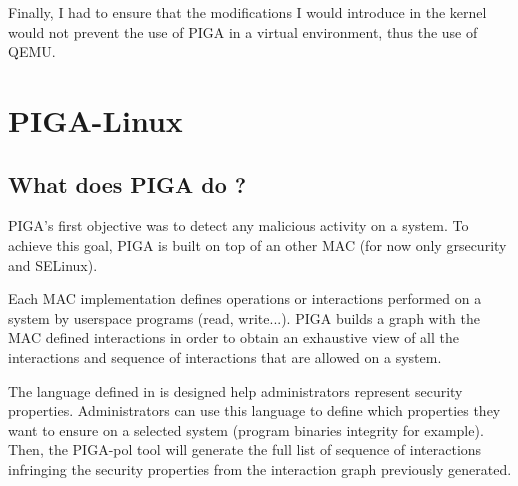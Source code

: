 \documentclass[pdftex,a4paper,titlepage,11pt]{article}
\begin{document}
\bigskip

Finally, I had to ensure that the modifications I would introduce in the kernel would not prevent the use of PIGA in a virtual environment, thus the use of QEMU.



\newpage

\section{PIGA-Linux}

\subsection{What does PIGA do ?}

PIGA's first objective was to detect any malicious activity on a system. To achieve this goal, PIGA is built on top of an other MAC (for now only grsecurity and SELinux). 

\bigskip

Each MAC implementation defines operations or interactions performed on a system by userspace programs (read, write...). PIGA  builds a graph with the MAC defined interactions in order to obtain an exhaustive view of all the interactions and sequence of interactions that are allowed on a system.

\bigskip

The language defined in \cite{THESEBRIFFAUT} is designed help administrators represent security properties. Administrators can use this language to define which properties they want to ensure on a selected system (program binaries integrity for example). Then, the PIGA-pol tool will generate the full list of sequence of interactions infringing the security properties from the interaction graph previously generated.
\end{document}
